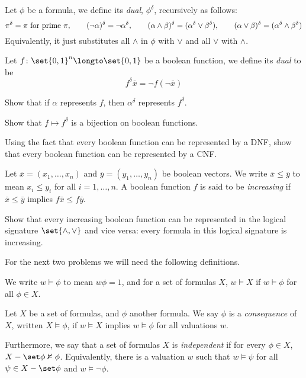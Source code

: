 \bprob

    Let $\phi$ be a formula, we define its {\it dual}, $\phi^\delta$, recursively as follows:
    $$ \pi^\delta = \pi \hbox{ for prime $\pi$},\qquad (\neg\alpha)^\delta=\neg\alpha^\delta,
    \qquad (\alpha\land\beta)^\delta = (\alpha^\delta\lor\beta^\delta),\qquad
    (\alpha\lor\beta)^\delta = (\alpha^\delta\land\beta^\delta) $$
    Equivalently, it just substitutes all $\land$ in $\phi$ with $\lor$ and all $\lor$ with
    $\land$.

    Let $f\colon\set{0,1}^n\longto\set{0,1}$ be a boolean function, we define its {\it dual} to be
    $$ f^\delta\bar x = \neg f(\neg\bar x) $$

    \benum
        \item Show that if $\alpha$ represents $f$, then $\alpha^\delta$ represents $f^\delta$.
        \item Show that $f\mapsto f^\delta$ is a bijection on boolean functions.
        \item Using the fact that every boolean function can be represented by a DNF, show that
        every boolean function can be represented by a CNF.
    \eenum

\eprob

\bprob

    Let $\bar x=(x_1,\dots,x_n)$ and $\bar y=(y_1,\dots,y_n)$ be boolean vectors.
    We write $\bar x\leq\bar y$ to mean $x_i\leq y_i$ for all $i=1,\dots,n$.
    A boolean function $f$ is said to be {\it increasing} if $\bar x\leq\bar y$ implies
    $f\bar x\leq f\bar y$.

    Show that every increasing boolean function can be represented in the logical signature
    $\set{{\land},{\lor}}$ and vice versa: every formula in this logical signature is increasing.

\eprob

For the next two problems we will need the following definitions.

We write $w\vDash\phi$ to mean $w\phi=1$, and for a set of formulas $X$, $w\vDash X$ if
$w\vDash\phi$ for all $\phi\in X$.

Let $X$ be a set of formulas, and $\phi$ another formula.
We say $\phi$ is a {\it consequence} of $X$, written $X\vDash\phi$, if $w\vDash X$ implies
$w\vDash\phi$ for all valuations $w$.

Furthermore, we say that a set of formulas $X$ is {\it independent} if for every $\phi\in X$,
$X-\set\phi\nvDash\phi$.
Equivalently, there is a valuation $w$ such that $w\vDash\psi$ for all $\psi\in X-\set\phi$ and
$w\vDash\neg\phi$.

